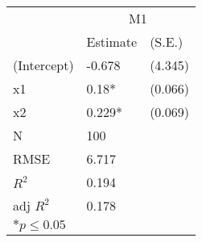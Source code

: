 \begin{tabular}{*{3}{l}}
 \hline
                &\multicolumn{2}{c}{M1}   \\
                &Estimate &(S.E.) \\
 \hline
 \hline
  (Intercept)    & -0.678  &   (4.345) \\
  x1             &  0.18*  &   (0.066) \\
  x2             &  0.229*  &   (0.069) \\
 \hline 
 N                &100      &       \\
 RMSE            &6.717        & \\
 $R^2$           &0.194        & \\
 adj $R^2$       &0.178        & \\
 \hline
 \hline
 
 \multicolumn{2}{l}{${*}  p \le 0.05$   }\\
 \end{tabular}